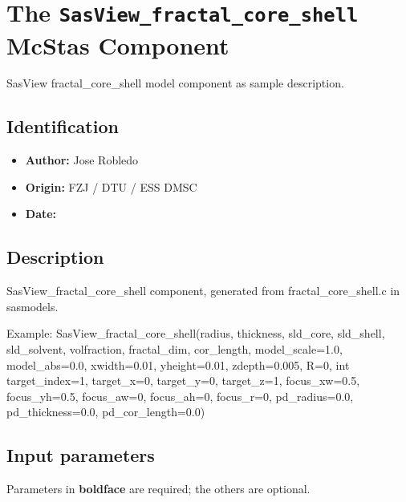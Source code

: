 \section{The \texttt{SasView\_fractal\_core\_shell} McStas Component}
SasView fractal\_core\_shell model component as sample description.

\subsection*{Identification}
\begin{itemize}
  \item \textbf{Author:} Jose Robledo
  \item \textbf{Origin:} FZJ / DTU / ESS DMSC
  \item \textbf{Date:} 
\end{itemize}

\subsection*{Description}
SasView\_fractal\_core\_shell component, generated from fractal\_core\_shell.c in sasmodels.

Example: SasView\_fractal\_core\_shell(radius, thickness, sld\_core, sld\_shell, sld\_solvent, volfraction, fractal\_dim, cor\_length, model\_scale=1.0, model\_abs=0.0, xwidth=0.01, yheight=0.01, zdepth=0.005, R=0, int target\_index=1, target\_x=0, target\_y=0, target\_z=1, focus\_xw=0.5, focus\_yh=0.5, focus\_aw=0, focus\_ah=0, focus\_r=0, pd\_radius=0.0, pd\_thickness=0.0, pd\_cor\_length=0.0)

\subsection*{Input parameters}
Parameters in \textbf{boldface} are required; the others are optional.

